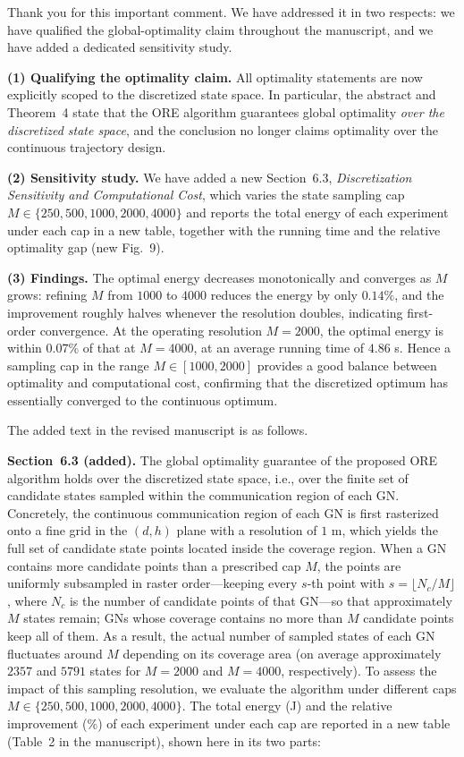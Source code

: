 \begin{revresponse}[]
	Thank you for this important comment. We have addressed it in two respects: we have qualified the global-optimality claim throughout the manuscript, and we have added a dedicated sensitivity study.

	\textbf{(1) Qualifying the optimality claim.} All optimality statements are now explicitly scoped to the discretized state space. In particular, the abstract and Theorem~4 state that the ORE algorithm guarantees global optimality \emph{over the discretized state space}, and the conclusion no longer claims optimality over the continuous trajectory design.

	\textbf{(2) Sensitivity study.} We have added a new Section~6.3, \emph{Discretization Sensitivity and Computational Cost}, which varies the state sampling cap $M\in\{250,500,1000,2000,4000\}$ and reports the total energy of each experiment under each cap in a new table, together with the running time and the relative optimality gap (new Fig.~9).

	\textbf{(3) Findings.} The optimal energy decreases monotonically and converges as $M$ grows: refining $M$ from $1000$ to $4000$ reduces the energy by only $0.14\%$, and the improvement roughly halves whenever the resolution doubles, indicating first-order convergence. At the operating resolution $M=2000$, the optimal energy is within $0.07\%$ of that at $M=4000$, at an average running time of $4.86$ s. Hence a sampling cap in the range $M\in[1000,2000]$ provides a good balance between optimality and computational cost, confirming that the discretized optimum has essentially converged to the continuous optimum.

	The added text in the revised manuscript is as follows.
	\begin{changes}
		\textbf{Section~6.3 (added).} The global optimality guarantee of the proposed ORE algorithm holds over the discretized state space, i.e., over the finite set of candidate states sampled within the communication region of each GN. Concretely, the continuous communication region of each GN is first rasterized onto a fine grid in the $(d,h)$ plane with a resolution of $1$ m, which yields the full set of candidate state points located inside the coverage region. When a GN contains more candidate points than a prescribed cap $M$, the points are uniformly subsampled in raster order---keeping every $s$-th point with $s=\lfloor N_c/M\rfloor$, where $N_c$ is the number of candidate points of that GN---so that approximately $M$ states remain; GNs whose coverage contains no more than $M$ candidate points keep all of them. As a result, the actual number of sampled states of each GN fluctuates around $M$ depending on its coverage area (on average approximately $2357$ and $5791$ states for $M=2000$ and $M=4000$, respectively). To assess the impact of this sampling resolution, we evaluate the algorithm under different caps $M\in\{250,500,1000,2000,4000\}$. The total energy (J) and the relative improvement (\%) of each experiment under each cap are reported in a new table (Table~2 in the manuscript), shown here in its two parts:


\end{changes}
\end{revresponse}
